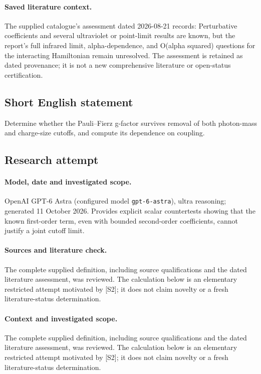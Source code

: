 \documentclass[11pt]{article}
\begin{document}
\paragraph{Saved literature context.} The supplied catalogue's assessment dated 2026-08-21 records: Perturbative coefficients and several ultraviolet or point-limit results are known, but the report's full infrared limit, alpha-dependence, and O(alpha squared) questions for the interacting Hamiltonian remain unresolved. The assessment is retained as dated provenance; it is not a new comprehensive literature or open-status certification.
\subsection{Short English statement}
Determine whether the Pauli--Fierz g-factor survives removal of both photon-mass and charge-size cutoffs, and compute its dependence on coupling.
\subsection{Research attempt}
\paragraph{Model, date and investigated scope.}
OpenAI GPT-6 Astra (configured model \texttt{gpt-6-astra}), ultra reasoning; generated 11 October 2026. Provides explicit scalar countertests showing that the known first-order term, even with bounded second-order coefficients, cannot justify a joint cutoff limit.

\paragraph{Sources and literature check.}
The complete supplied definition, including source qualifications and the dated literature assessment, was reviewed. The calculation below is an elementary restricted attempt motivated by [S2]; it does not claim novelty or a fresh literature-status determination.

\paragraph{Context and investigated scope.} The complete supplied definition, including source qualifications and the dated literature assessment, was reviewed. The calculation below is an elementary restricted attempt motivated by [S2]; it does not claim novelty or a fresh literature-status determination.
\end{document}
